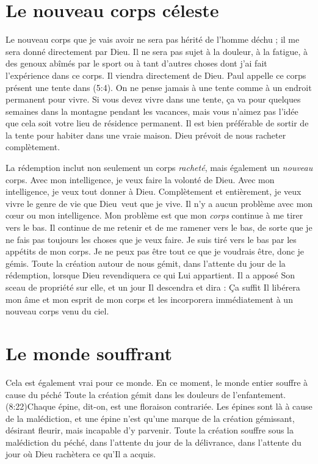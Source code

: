 \section{Le nouveau corps c\'eleste}

Le nouveau corps que je vais avoir ne sera pas hérité de l'homme déchu ;
 il me sera donné directement par Dieu.
 Il ne sera pas sujet à la douleur, à la fatigue, à des genoux abîmés
 par le sport ou à tant d'autres choses dont j'ai fait l'expérience
  dans ce corps. Il viendra directement de Dieu.
 Paul appelle ce corps présent une \Og tente \Fg{} dans (5:4).
 On ne pense jamais à une tente comme à un endroit permanent pour vivre.
 Si vous devez vivre dans une tente, ça va pour quelques semaines
 dans la montagne pendant les vacances, mais vous n'aimez pas l'idée
 que cela soit votre lieu de résidence permanent.
 Il est bien préférable de sortir de la tente pour habiter dans une vraie maison.
 Dieu prévoit de nous racheter complètement.

La rédemption inclut non seulement un corps \emph{racheté}, mais également
 un \emph{nouveau} corps. Avec mon intelligence, je veux faire la volonté de Dieu.
 Avec mon intelligence, je veux tout donner à Dieu.
 Complètement et entièrement, je veux vivre le genre de vie que Dieu~veut
 que je vive. Il n'y a aucun problème avec mon cœur ou mon intelligence.
 Mon problème est que mon \emph{corps} continue à me tirer vers le bas.
 Il continue de me retenir et de me ramener vers le bas, de sorte que je ne fais pas toujours
 les choses que je veux faire. Je suis tiré vers le bas par les appétits
 de mon corps. Je ne peux pas être tout ce que je voudrais être,
 donc je gémis. Toute la création autour de nous gémit,
 dans l'attente du jour de la rédemption, lorsque Dieu revendiquera ce qui Lui appartient.
 Il a apposé Son sceau de propriété sur elle, et un jour Il descendra
 et dira : \Og Ça suffit \Fg{}
 Il libérera mon âme et mon esprit de mon corps et les incorporera
 immédiatement à un nouveau corps venu du ciel.


\section{Le monde souffrant}

Cela est également vrai pour ce monde.
 En ce moment, le monde entier souffre à cause du péché\frcolon{}
 \Og Toute la création gémit dans les douleurs de l'enfantement. \Fg{}
 (8:22)Chaque épine, dit-on,
 est une floraison contrariée.
 Les épines sont là à cause de la malédiction, et une épine n'est qu'une 
 marque de la création gémissant, désirant fleurir, mais incapable
 d'y parvenir. Toute la création souffre sous la malédiction du péché,
 dans l'attente du jour de la délivrance, dans l'attente du jour
 où Dieu rachètera ce qu'Il a acquis.


